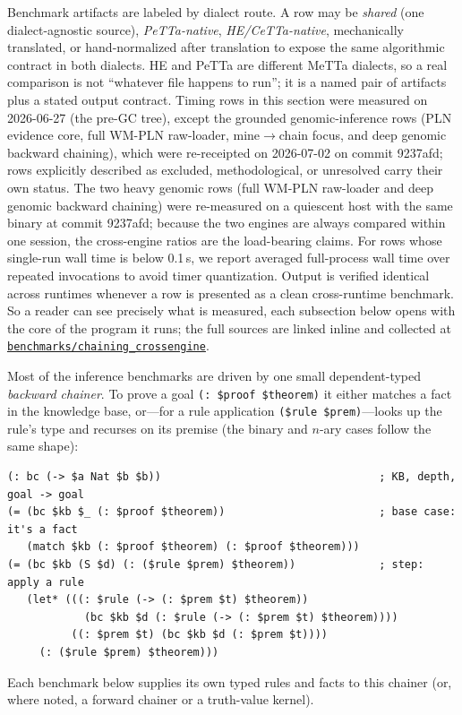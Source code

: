 \documentclass[11pt]{article}
\newcommand{\code}[1]{\texttt{#1}}
\newcommand{\PeTTa}{\textup{PeTTa}}
\newcommand{\HE}{\textup{HE}}
\newcommand{\CeTTa}{\textup{CeTTa}}
\begin{document}
Benchmark artifacts are labeled by dialect route.  A row may be
\emph{shared} (one dialect-agnostic source), \emph{\PeTTa{}-native},
\emph{\HE{}/\CeTTa{}-native}, mechanically translated, or hand-normalized
after translation to expose the same algorithmic contract in both
dialects.  \HE{} and \PeTTa{} are different MeTTa dialects, so a real
comparison is not ``whatever file happens to run''; it is a named pair of
artifacts plus a stated output contract.  Timing rows in this section
were measured on 2026-06-27 (the pre-GC tree), except the grounded
genomic-inference rows (PLN evidence core, full WM-PLN raw-loader,
mine$\to$chain focus, and deep genomic backward chaining), which were
re-receipted on 2026-07-02 on commit 9237afd; rows explicitly described
as excluded, methodological, or unresolved carry their own status.  The
two heavy genomic rows (full WM-PLN raw-loader and deep genomic backward
chaining) were re-measured on a quiescent host with the same binary at
commit 9237afd; because the two engines are always compared within one
session, the cross-engine ratios are the load-bearing claims.  For rows
whose single-run wall time is below 0.1\,s, we report averaged
full-process wall time over repeated invocations to avoid timer
quantization.  Output is verified identical across runtimes whenever a
row is presented as a clean cross-runtime benchmark.  So a reader can see
precisely what is measured, each subsection below opens with the core of
the program it runs; the full sources are linked inline and collected at
\href{https://github.com/zariuq/CeTTa/tree/07928677c0237a19b2f3c32dffca28d7d2626723/benchmarks/chaining_crossengine}{\code{benchmarks/chaining\_crossengine}}.

Most of the inference benchmarks are driven by one small dependent-typed
\emph{backward chainer}.  To prove a goal \code{(: \$proof \$theorem)} it
either matches a fact in the knowledge base, or---for a rule application
\code{(\$rule \$prem)}---looks up the rule's type and recurses on its
premise (the binary and $n$-ary cases follow the same shape):
\begin{lstlisting}[language={},basicstyle=\ttfamily\scriptsize]
(: bc (-> $a Nat $b $b))                                  ; KB, depth, goal -> goal
(= (bc $kb $_ (: $proof $theorem))                        ; base case: it's a fact
   (match $kb (: $proof $theorem) (: $proof $theorem)))
(= (bc $kb (S $d) (: ($rule $prem) $theorem))             ; step: apply a rule
   (let* (((: $rule (-> (: $prem $t) $theorem))
            (bc $kb $d (: $rule (-> (: $prem $t) $theorem))))
          ((: $prem $t) (bc $kb $d (: $prem $t))))
     (: ($rule $prem) $theorem)))
\end{lstlisting}
Each benchmark below supplies its own typed rules and facts to this
chainer (or, where noted, a forward chainer or a truth-value kernel).
\end{document}
